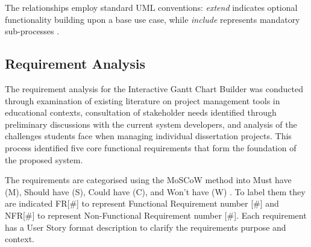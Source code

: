 \documentclass[12pt,nonacm,acmlarge,titlepage,screen]{acmart}
\begin{document}
The relationships employ standard UML conventions: \textit{extend} indicates optional functionality building upon a base use case, while \textit{include} represents mandatory sub-processes \cite{ArchiMetric_2024}. 

\subsection{Requirement Analysis} \label{cha:meth_req_anal}
The requirement analysis for the Interactive Gantt Chart Builder was conducted through examination of existing literature on project management tools in educational contexts, consultation of stakeholder needs identified through preliminary discussions with the current system developers, and analysis of the challenges students face when managing individual dissertation projects. This process identified five core functional requirements that form the foundation of the proposed system.

The requirements are categorised using the MoSCoW method into Must have (M), Should have (S), Could have (C), and Won't have (W) \cite{moscow_method_2020}. To label them they are indicated FR[\#] to represent Functional Requirement number [\#] and NFR[\#] to represent Non-Functional Requirement number [\#]. Each requirement has a User Story\cite{cohn_user_2009} format description to clarify the requirements purpose and context.
\end{document}
